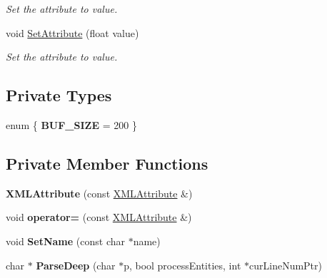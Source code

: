 \begin{DoxyCompactItemize}
\begin{DoxyCompactList}\small\item\em Set the attribute to value. \end{DoxyCompactList}\item 
void \hyperlink{classtinyxml2_1_1XMLAttribute_ae95e843313aaf5d56c32530b6456df02}{Set\+Attribute} (float value)\hypertarget{classtinyxml2_1_1XMLAttribute_ae95e843313aaf5d56c32530b6456df02}{}\label{classtinyxml2_1_1XMLAttribute_ae95e843313aaf5d56c32530b6456df02}

\begin{DoxyCompactList}\small\item\em Set the attribute to value. \end{DoxyCompactList}\end{DoxyCompactItemize}
\subsection*{Private Types}
\begin{DoxyCompactItemize}
\item 
enum \{ {\bfseries B\+U\+F\+\_\+\+S\+I\+ZE} = 200
 \}\hypertarget{classtinyxml2_1_1XMLAttribute_a1543d5687af193553e0803804c01f377}{}\label{classtinyxml2_1_1XMLAttribute_a1543d5687af193553e0803804c01f377}

\end{DoxyCompactItemize}
\subsection*{Private Member Functions}
\begin{DoxyCompactItemize}
\item 
{\bfseries X\+M\+L\+Attribute} (const \hyperlink{classtinyxml2_1_1XMLAttribute}{X\+M\+L\+Attribute} \&)\hypertarget{classtinyxml2_1_1XMLAttribute_a423410d8fb1b94f4514e34abf5432457}{}\label{classtinyxml2_1_1XMLAttribute_a423410d8fb1b94f4514e34abf5432457}

\item 
void {\bfseries operator=} (const \hyperlink{classtinyxml2_1_1XMLAttribute}{X\+M\+L\+Attribute} \&)\hypertarget{classtinyxml2_1_1XMLAttribute_a38e1d174a975bab27a70b4032e39a257}{}\label{classtinyxml2_1_1XMLAttribute_a38e1d174a975bab27a70b4032e39a257}

\item 
void {\bfseries Set\+Name} (const char $\ast$name)\hypertarget{classtinyxml2_1_1XMLAttribute_a469c2363600007f49e62a8048a362d57}{}\label{classtinyxml2_1_1XMLAttribute_a469c2363600007f49e62a8048a362d57}

\item 
char $\ast$ {\bfseries Parse\+Deep} (char $\ast$p, bool process\+Entities, int $\ast$cur\+Line\+Num\+Ptr)\hypertarget{classtinyxml2_1_1XMLAttribute_a4952364c1f0260c737ac3fcac756f5a5}{}\label{classtinyxml2_1_1XMLAttribute_a4952364c1f0260c737ac3fcac756f5a5}

\end{DoxyCompactItemize}
